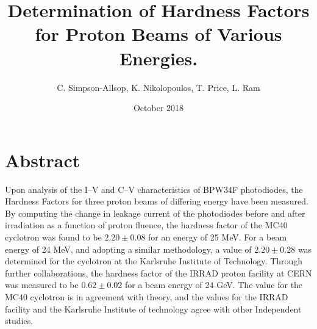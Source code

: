 \documentclass[12pt]{extarticle}
\title{Determination of Hardness Factors for Proton Beams of Various Energies.}
\author{C. Simpson-Allsop, K. Nikolopoulos, T. Price, L. Ram }
\date{October 2018}
\begin{document}
\maketitle
\section*{Abstract}

Upon analysis of the I--V and C--V characteristics of BPW34F photodiodes, the Hardness Factors for three proton beams of differing energy have been measured. By computing the change in leakage current of the photodiodes before and after irradiation as a function of proton fluence, the hardness factor of the MC40 cyclotron was found to be $2.20\pm 0.08$ for an energy of 25 MeV. For a beam energy of 24 MeV, and adopting a similar methodology, a value of $2.20 \pm 0.28$ was determined for the cyclotron at the Karlsruhe Institute of Technology. Through further collaborations, the hardness factor of the IRRAD proton facility at CERN was measured to be $0.62\pm 0.02$ for a beam energy of 24 GeV. The value for the MC40 cyclotron is in agreement with theory, and the values for the IRRAD facility and the Karlsruhe Institute of technology agree with other Independent studies.
\end{document}
